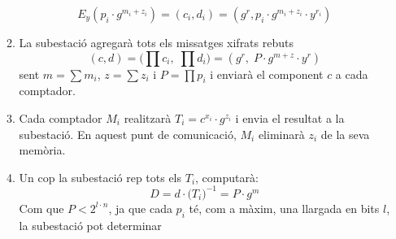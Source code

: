 \begin{enumerate}
\begin{enumerate}
		\[E_y(p_i \cdot g^{m_i + z_i}) = (c_i, d_i) = (g^r, p_i \cdot g^{m_i + z_i} \cdot y^{r_i})\]
		\item La subestació agregarà tots els missatges xifrats rebuts
		\[(c, d) = \Big( \prod c_i, \; \prod d_i \Big) = (g^r,\; P \cdot g^{m + z} \cdot y^r)\]
		sent $m = \sum m_i$, $z = \sum z_i$ i $P = \prod p_i$ i enviarà el component $c$ a cada comptador.
		\item Cada comptador $M_i$ realitzarà $T_i = c^{x_i} \cdot g^{z_i}$ i envia el resultat a la subestació. En aquest punt de comunicació, $M_i$ eliminarà $z_i$ de la seva memòria.
		\item Un cop la subestació rep tots els $T_i$, computarà:
		\[D = d \cdot \Big( T_i \Big)^{-1} = P \cdot g^m\]
		Com que $P < 2^{l \cdot n}$, ja que cada $p_i$ té, com a màxim, una llargada en bits $l$, la subestació pot determinar 
	\end{enumerate}
\end{enumerate}


